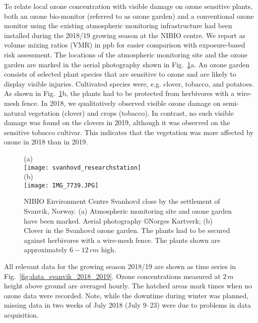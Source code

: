\documentclass[bg, manuscript]{copernicus}
\begin{document}
To relate local ozone concentration \chem{[O_3]} with visible damage on ozone sensitive plants, both an ozone bio-monitor (referred to as ozone garden) and a conventional ozone monitor using the existing atmospheric monitoring infrastructure had been installed during the 2018/19 growing season at the NIBIO centre. We report \chem{[O_3]} as volume mixing ratios (VMR) in \unit{ppb} for easier comparison with exposure-based risk assessment. The locations of the atmospheric monitoring site and the ozone garden are marked in the aerial photography shown in Fig.~\ref{fig:svanhovd_research_station}a. An ozone garden consists of selected plant species that are sensitive to ozone and are likely to display visible injuries. Cultivated species were, e.g. clover, tobacco, and potatoes. As shown in Fig.~\ref{fig:svanhovd_research_station}b, the plants had to be protected from herbivores with a wire-mesh fence. In 2018, we qualitatively observed visible ozone damage on semi-natural vegetation (clover) and crops (tobacco). In contrast, no such visible damage was found on the clovers in 2019, although it was observed on the sensitive tobacco cultivar. This indicates that the vegetation was more affected by ozone in 2018 than in 2019.

\begin{figure}[t]
  \centering
  (a)\\
  \texttt{[image: svanhovd\_researchstation]}\\
  (b)\\
  \texttt{[image: IMG\_7739.JPG]}
  \caption{NIBIO Environment Centre Svanhovd close by the settlement of Svanvik, Norway. (a) Atmospheric monitoring site and ozone garden have been marked. Aerial photography \copyright Norges Kartverk; (b) Clover in the Svanhovd ozone garden. The plants had to be secured against herbivores with a wire-mesh fence. The plants shown are approximately $6-12\,\unit{cm}$ high.}
  \label{fig:svanhovd_research_station}
\end{figure}

All relevant data for the growing season 2018/19 are shown as time series in Fig.~\ref{fig:data_svanvik_2018_2019}. Ozone concentrations measured at $2\,\unit{m}$ height above ground are averaged hourly. The hatched areas mark times when no ozone data were recorded. Note, while the downtime during winter was planned, missing data in two weeks of July 2018 (July 9--23) were due to problems in data acquisition.
\end{document}
